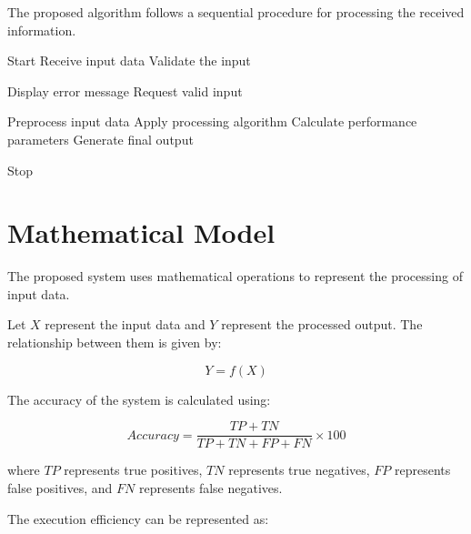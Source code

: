 \documentclass[conference]{IEEEtran}
\begin{document}
The proposed algorithm follows a sequential procedure for
processing the received information.

\begin{algorithm}[H]

\caption{Automated Data Processing}

\begin{algorithmic}[1]

\STATE Start
\STATE Receive input data
\STATE Validate the input


\STATE Display error message
\STATE Request valid input

\ELSE

\STATE Preprocess input data
\STATE Apply processing algorithm
\STATE Calculate performance parameters
\STATE Generate final output

\ENDIF

\STATE Stop

\end{algorithmic}

\end{algorithm}


\section{Mathematical Model}

The proposed system uses mathematical operations to represent
the processing of input data.

Let $X$ represent the input data and $Y$ represent the
processed output. The relationship between them is given by:

\begin{equation}
Y = f(X)
\label{eq:basic}
\end{equation}

The accuracy of the system is calculated using:

\begin{equation}
Accuracy =
\frac{TP+TN}
{TP+TN+FP+FN}
\times 100
\label{eq:accuracy}
\end{equation}

where $TP$ represents true positives, $TN$ represents true
negatives, $FP$ represents false positives, and $FN$
represents false negatives.

The execution efficiency can be represented as:
\end{document}
